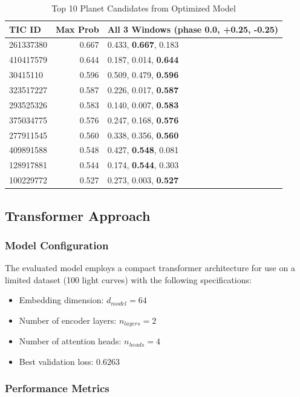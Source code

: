 \documentclass[letterpaper]{article} %
\begin{document}
\begin{table}[h]
\centering
\caption{Top 10 Planet Candidates from Optimized Model}
\label{tab:top_candidates}
\begin{tabular}{@{}lrp{4.8cm}@{}}
\toprule
\textbf{TIC ID} & \textbf{Max Prob} & \textbf{All 3 Windows (phase 0.0, +0.25, -0.25)} \\
\midrule
261337380 & 0.667 & 0.433, \textbf{0.667}, 0.183 \\
410417579 & 0.644 & 0.187, 0.014, \textbf{0.644} \\
30415110 & 0.596 & 0.509, 0.479, \textbf{0.596} \\
323517227 & 0.587 & 0.226, 0.017, \textbf{0.587} \\
293525326 & 0.583 & 0.140, 0.007, \textbf{0.583} \\
375034775 & 0.576 & 0.247, 0.168, \textbf{0.576} \\
277911545 & 0.560 & 0.338, 0.356, \textbf{0.560} \\
409891588 & 0.548 & 0.427, \textbf{0.548}, 0.081 \\
128917881 & 0.544 & 0.174, \textbf{0.544}, 0.303 \\
100229772 & 0.527 & 0.273, 0.003, \textbf{0.527} \\
\bottomrule
\end{tabular}
\end{table}

\subsection{Transformer Approach}

\subsubsection*{Model Configuration}
The evaluated model employs a compact transformer architecture for use on a limited dataset (100 light curves) with the following specifications:
\begin{itemize}
    \item Embedding dimension: \(d_{model} = 64\)
    \item Number of encoder layers: \(n_{layers} = 2\)
    \item Number of attention heads: \(n_{heads} = 4\)
    \item Best validation loss: \(0.6263\)
\end{itemize}

\subsubsection*{Performance Metrics}
\end{document}
